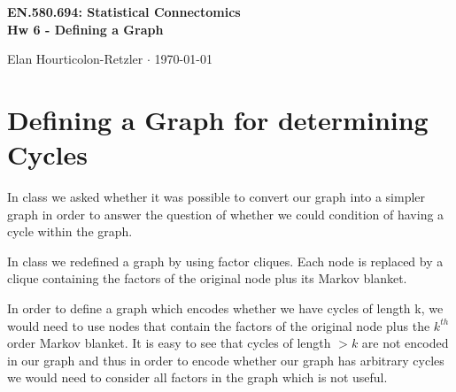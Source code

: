 \documentclass[12pt]{article}
\begin{document}
\begin{center}\Large \bf EN.580.694: Statistical Connectomics \\ Hw 6 - Defining a Graph \end{center}
\begin{center} Elan Hourticolon-Retzler $\cdot$  \today \end{center}
\bigskip


\section*{Defining a Graph for determining Cycles} 

In class we asked whether it was possible to convert our graph into a simpler graph in order to answer the question of whether we could condition of having a cycle within the graph. 

In class we redefined a graph by using factor cliques. Each node is replaced by a clique containing the factors of the original node plus its Markov blanket. 

In order to define a graph which encodes whether we have cycles of length k, we would need to use nodes that contain the factors of the original node plus the $k^{th}$ order Markov blanket. It is easy to see that cycles of length $>k$ are not encoded in our graph and thus in order to encode whether our graph has arbitrary cycles we would need to consider all factors in the graph which is not useful. 
\end{document}
